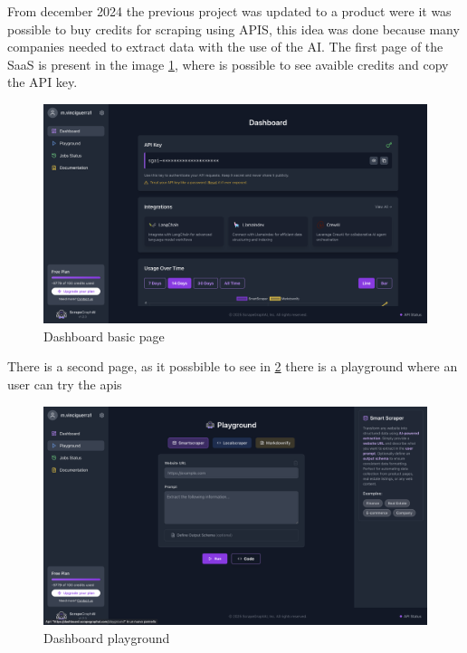 From december 2024 the previous project was updated to a product were it was possible to buy credits for scraping using APIS, this idea was done because many companies needed to extract data with the use of the AI.
The  first page of the SaaS is present in the image \ref{fig:enter-dashboard-basi}, where is possible to see avaible credits and copy the API key.
\begin{figure}[H]
    \centering
    \includegraphics[width=0.95\linewidth]{Assets/dashboard_1.png}
    \caption{Dashboard basic page}
    \label{fig:enter-dashboard-basi}
\end{figure}

There is a second page, as it possbible to see in \ref{fig:enter-dashboard-playground} there is a playground where an user can try the apis
\begin{figure}[H]
    \centering
    \includegraphics[width=0.95\linewidth]{Assets/dashboard_2.png}
    \caption{Dashboard playground}
    \label{fig:enter-dashboard-playground}
\end{figure}

